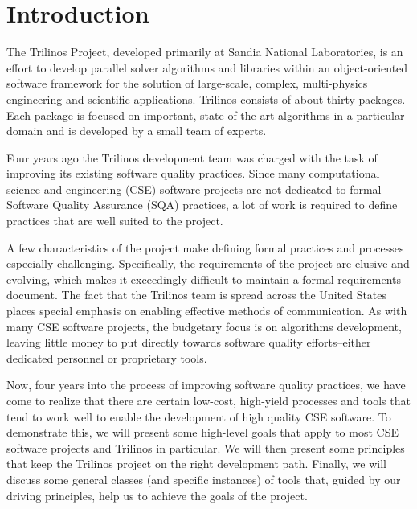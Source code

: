 \documentclass[12pt,relax]{article}
\begin{document}

\section{Introduction}
\label{Section:Introduction}


The Trilinos Project, developed primarily at Sandia National Laboratories, is
an effort to develop parallel solver algorithms and libraries within an
object-oriented software framework for the solution of large-scale, complex,
multi-physics engineering and scientific applications.  Trilinos consists of
about thirty packages.  Each package is focused on important, state-of-the-art
algorithms in a particular domain and is developed by a small team of experts.

Four years ago the Trilinos development team was charged with the task of
improving its existing software quality practices.  Since many computational
science and engineering (CSE) software projects are not dedicated to formal
Software Quality Assurance (SQA) practices, a lot of work is required to define
practices that are well suited to the project.

A few characteristics of the project make defining formal practices and
processes especially challenging.  Specifically, the requirements of the
project are elusive and evolving, which makes it exceedingly difficult to
maintain a formal requirements document.  The fact that the Trilinos team is
spread across the United States places special emphasis on enabling effective
methods of communication.  As with many CSE software projects, the budgetary
focus is on algorithms development, leaving little money to put directly
towards software quality efforts--either dedicated personnel or proprietary
tools.

Now, four years into the process of improving software quality practices, we 
have come to realize that there are certain low-cost, high-yield processes and
tools that tend to work well to enable the development of high quality CSE
software.  To demonstrate this, we will present some high-level goals that 
apply to most CSE software projects and Trilinos in particular.  We will then
present some principles that keep the Trilinos project on the right development
path.  Finally, we will discuss some general classes (and specific instances)
of tools that, guided by our driving principles, help us to achieve the goals
of the project.
\end{document}
